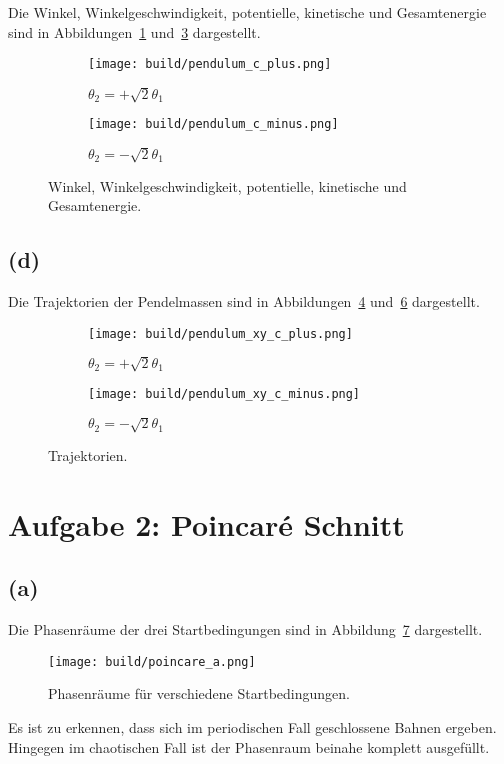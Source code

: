 \documentclass{scrartcl}
\begin{document}
Die Winkel, Winkelgeschwindigkeit, potentielle, kinetische und Gesamtenergie sind in
Abbildungen~\ref{fig:cp} und~\ref{fig:cm} dargestellt.
\begin{figure}[ht]
  \centering
  \begin{subfigure}{0.8\textwidth}
    \centering
    \texttt{[image: build/pendulum\_c\_plus.png]}
    \caption{$\theta_2 = +\sqrt{2}\theta_1$}
    \label{fig:cp}
  \end{subfigure}

  \begin{subfigure}{0.8\textwidth}
    \centering
    \texttt{[image: build/pendulum\_c\_minus.png]}
    \caption{$\theta_2 = -\sqrt{2}\theta_1$}
    \label{fig:cm}
  \end{subfigure}
  \caption{Winkel, Winkelgeschwindigkeit, potentielle, kinetische und Gesamtenergie.}
\end{figure}

\subsection*{(d)}
Die Trajektorien der Pendelmassen sind in Abbildungen~\ref{fig:dp} und~\ref{fig:dm} dargestellt.
\begin{figure}[ht]
  \centering
  \begin{subfigure}{0.8\textwidth}
    \centering
    \texttt{[image: build/pendulum\_xy\_c\_plus.png]}
    \caption{$\theta_2 = +\sqrt{2}\theta_1$}
    \label{fig:dp}
  \end{subfigure}

  \begin{subfigure}{0.8\textwidth}
    \centering
    \texttt{[image: build/pendulum\_xy\_c\_minus.png]}
    \caption{$\theta_2 = -\sqrt{2}\theta_1$}
    \label{fig:dm}
  \end{subfigure}
  \caption{Trajektorien.}
\end{figure}




\section*{Aufgabe 2: Poincar\'e Schnitt}
\subsection*{(a)}
Die Phasenr\"aume der drei Startbedingungen sind in Abbildung~\ref{fig:2a} dargestellt.
\begin{figure}[ht]
  \centering
  \texttt{[image: build/poincare\_a.png]}
  \caption{Phasenr\"aume f\"ur verschiedene Startbedingungen.}%
  \label{fig:2a}
\end{figure}
Es ist zu erkennen, dass sich im periodischen Fall geschlossene Bahnen ergeben.
Hingegen im chaotischen Fall ist der Phasenraum beinahe komplett ausgef\"ullt.
\end{document}

